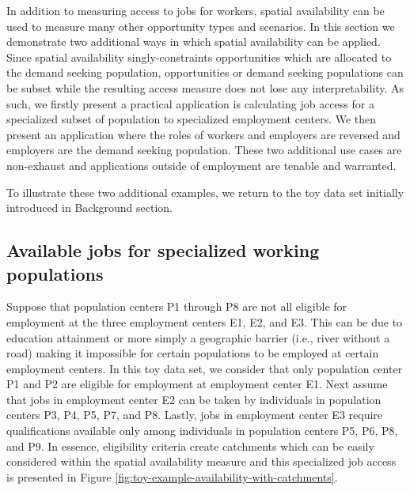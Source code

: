 \documentclass[]{elsarticle} %
\begin{document}
In addition to measuring access to jobs for workers, spatial
availability can be used to measure many other opportunity types and
scenarios. In this section we demonstrate two additional ways in which
spatial availability can be applied. Since spatial availability
singly-constraints opportunities which are allocated to the demand
seeking population, opportunities or demand seeking populations can be
subset while the resulting access measure does not lose any
interpretability. As such, we firstly present a practical application is
calculating job access for a specialized subset of population to
specialized employment centers. We then present an application where the
roles of workers and employers are reversed and employers are the demand
seeking population. These two additional use cases are non-exhaust and
applications outside of employment are tenable and warranted.

To illustrate these two additional examples, we return to the toy data
set initially introduced in
\protect\hypertarget{background}{}{Background} section.

\hypertarget{available-jobs-for-specialized-working-populations}{%
\subsection{Available jobs for specialized working
populations}\label{available-jobs-for-specialized-working-populations}}

Suppose that population centers P1 through P8 are not all eligible for
employment at the three employment centers E1, E2, and E3. This can be
due to education attainment or more simply a geographic barrier (i.e.,
river without a road) making it impossible for certain populations to be
employed at certain employment centers. In this toy data set, we
consider that only population center P1 and P2 are eligible for
employment at employment center E1. Next assume that jobs in employment
center E2 can be taken by individuals in population centers P3, P4, P5,
P7, and P8. Lastly, jobs in employment center E3 require qualifications
available only among individuals in population centers P5, P6, P8, and
P9. In essence, eligibility criteria create catchments which can be
easily considered within the spatial availability measure and this
specialized job access is presented in Figure
\ref{fig:toy-example-availability-with-catchments}.
\end{document}
